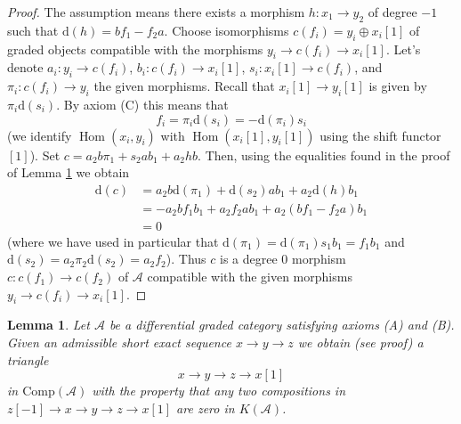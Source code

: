 \documentclass{stacks-project}
\theoremstyle{plain}
\newtheorem{lemma}[subsection]{Lemma}
\theoremstyle{definition}
\theoremstyle{remark}
\numberwithin{equation}{subsection}
\def\Hom{\mathop{\mathrm{Hom}}\nolimits}
\begin{document}
\begin{proof}
The assumption means there exists a morphism $h : x_1 \to y_2$ of degree
$-1$ such that $\text{d}(h) = b f_1 - f_2 a$. Choose isomorphisms
$c(f_i) = y_i \oplus x_i[1]$ of graded objects compatible with the
morphisms $y_i \to c(f_i) \to x_i[1]$. Let's denote
$a_i : y_i \to c(f_i)$, $b_i : c(f_i) \to x_i[1]$, $s_i : x_i[1] \to c(f_i)$,
and $\pi_i : c(f_i) \to y_i$ the given morphisms. Recall that
$x_i[1] \to y_i[1]$ is given by $\pi_i \text{d}(s_i)$. By axiom (C)
this means that
$$
f_i = \pi_i \text{d}(s_i) = - \text{d}(\pi_i) s_i
$$
(we identify $\Hom(x_i, y_i)$ with $\Hom(x_i[1], y_i[1])$
using the shift functor $[1]$).
Set $c = a_2 b \pi_1 + s_2 a b_1 + a_2hb$. Then, using the
equalities found in the proof of Lemma \ref{lemma-get-triangle}
we obtain
\begin{align*}
\text{d}(c)
& =
a_2 b \text{d}(\pi_1) + \text{d}(s_2) a b_1 + a_2 \text{d}(h) b_1 \\
& =
- a_2 b f_1 b_1 + a_2 f_2 a b_1 + a_2 (b f_1 - f_2 a) b_1 \\
& = 0
\end{align*}
(where we have used in particular that
$\text{d}(\pi_1) = \text{d}(\pi_1) s_1 b_1 = f_1 b_1$ and
$\text{d}(s_2) = a_2 \pi_2 \text{d}(s_2) = a_2 f_2$).
Thus $c$ is a degree $0$ morphism $c : c(f_1) \to c(f_2)$ of $\mathcal{A}$
compatible with the given morphisms $y_i \to c(f_i) \to x_i[1]$.
\end{proof}

\begin{lemma}
\label{lemma-get-triangle}
Let $\mathcal{A}$ be a differential graded category satisfying
axioms (A) and (B). Given an admissible short exact sequence
$x \to y \to z$ we obtain (see proof) a triangle
$$
x \to y \to z \to x[1]
$$
in $\text{Comp}(\mathcal{A})$ with the property that any two compositions
in $z[-1] \to x \to y \to z \to x[1]$ are zero in $K(\mathcal{A})$.
\end{lemma}
\end{document}
